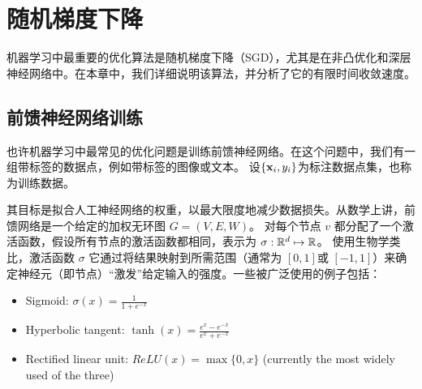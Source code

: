 \chapter{
    随机梯度下降
    } \label{chapter:SGD}


机器学习中最重要的优化算法是随机梯度下降（SGD），尤其是在非凸优化和深层神经网络中。在本章中，我们详细说明该算法，并分析了它的有限时间收敛速度。

\section{
    前馈神经网络训练
    }

也许机器学习中最常见的优化问题是训练前馈神经网络。在这个问题中，我们有一组带标签的数据点，例如带标签的图像或文本。
设$\{\mathbf x_i,y_i\}$为标注数据点集，也称为训练数据。

其目标是拟合人工神经网络的权重，以最大限度地减少数据损失。从数学上讲，前馈网络是一个给定的加权无环图 $G=(V,E,W)$。
对每个节点 $v$ 都分配了一个激活函数，假设所有节点的激活函数都相同，表示为 $\sigma: {\mathbb R}^d \mapsto {\mathbb R}$。
使用生物学类比，激活函数 $\sigma$ 它通过将结果映射到所需范围（通常为 $[0,1]$或 $[-1,1]$）来确定神经元（即节点）“激发”给定输入的强度。一些被广泛使用的例子包括：
\begin{itemize}
\item Sigmoid: $\sigma(x) = \frac{1}{1 + e^{-x}}$
\item Hyperbolic tangent: $\tanh(x) = \frac{e^x - e^{-x}}{e^x + e^{-x}}$
\item Rectified linear unit: $ReLU(x) = \max\{0, x\}$ (currently the most widely used of the three) 
\end{itemize}

